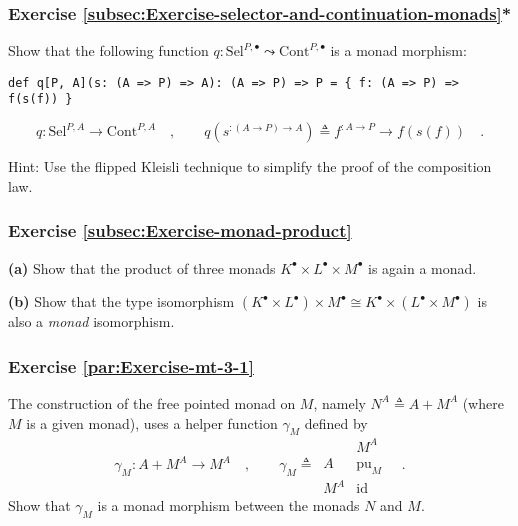 \subsubsection{Exercise \label{subsec:Exercise-selector-and-continuation-monads}\ref{subsec:Exercise-selector-and-continuation-monads}{*}}

Show that the following function $q:\text{Sel}^{P,\bullet}\leadsto\text{Cont}^{P,\bullet}$
is a monad morphism:
\begin{lstlisting}
def q[P, A](s: (A => P) => A): (A => P) => P = { f: (A => P) => f(s(f)) }
\end{lstlisting}
\[
q:\text{Sel}^{P,A}\rightarrow\text{Cont}^{P,A}\quad,\quad\quad q(s^{:(A\rightarrow P)\rightarrow A})\triangleq f^{:A\rightarrow P}\rightarrow f(s(f))\quad.
\]

Hint: Use the flipped Kleisli technique to simplify the proof of the
composition law.

\subsubsection{Exercise \label{subsec:Exercise-monad-product}\ref{subsec:Exercise-monad-product}}

\textbf{(a)} Show that the product of three monads $K^{\bullet}\times L^{\bullet}\times M^{\bullet}$
is again a monad.

\textbf{(b)} Show that the type isomorphism $(K^{\bullet}\times L^{\bullet})\times M^{\bullet}\cong K^{\bullet}\times(L^{\bullet}\times M^{\bullet})$
is also a \emph{monad} isomorphism.

\subsubsection{Exercise \label{par:Exercise-mt-3-1}\ref{par:Exercise-mt-3-1}}

The construction of the free pointed monad on $M$, namely $N^{A}\triangleq A+M^{A}$
(where $M$ is a given monad), uses a helper function $\gamma_{M}$
defined by
\[
\gamma_{M}:A+M^{A}\rightarrow M^{A}\quad,\quad\quad\gamma_{M}\triangleq\,\begin{array}{|c||c|}
 & M^{A}\\
\hline A & \text{pu}_{M}\\
M^{A} & \text{id}
\end{array}\quad.
\]
Show that $\gamma_{M}$ is a monad morphism between the monads $N$
and $M$.

